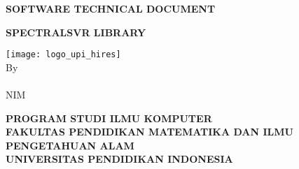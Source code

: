 \begin{titlepage}
    \begin{center}

        \textbf{\MakeUppercase{SOFTWARE TECHNICAL DOCUMENT}}\\[1cm]
        \begin{doublespace}
            \textbf{\MakeUppercase{SpectralSVR Library}}\\[1cm]
        \end{doublespace}

        \vfill

        \texttt{[image: logo\_upi\_hires]}\\[1cm]
        By\\
        \penulis{}\\
        NIM \nim{}\\
        \vfill

        \textbf{\MakeUppercase{program studi ilmu komputer}}\\
        \textbf{\MakeUppercase{fakultas pendidikan matematika dan ilmu pengetahuan alam}}\\
        \textbf{\MakeUppercase{UNIVERSITAS PENDIDIKAN INDONESIA}}\\
        \textbf{\the\year{}}\\
    \end{center}
\end{titlepage}
